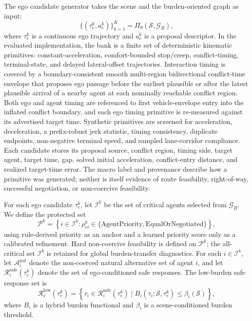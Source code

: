 \documentclass[10pt]{article}
\begin{document}
The ego candidate generator takes the scene and the burden-oriented graph as input:
\begin{equation}
    \{(\tau^k_e, a^k_e)\}_{k=1}^{K}
    =
    \Pi_{\theta}(\mathcal{S}, \mathcal{G}_B),
\end{equation}
where $\tau^k_e$ is a continuous ego trajectory and $a^k_e$ is a proposal descriptor. In the evaluated implementation, the bank is a finite set of deterministic kinematic primitives: constant-acceleration, comfort-bounded stop/creep, conflict-timing, terminal-state, and delayed lateral-offset trajectories. Interaction timing is covered by a boundary-consistent smooth multi-region bidirectional conflict-time envelope that proposes ego passage before the earliest plausible or after the latest plausible arrival of a nearby agent at each nominally reachable conflict region. Both ego and agent timing are referenced to first vehicle-envelope entry into the inflated conflict boundary, and each ego timing primitive is re-measured against its advertised target time. Synthetic primitives are screened for acceleration, deceleration, a prefix-robust jerk statistic, timing consistency, duplicate endpoints, non-negative terminal speed, and sampled lane-corridor compliance. Each candidate stores its proposal source, conflict region, timing side, target agent, target time, gap, solved initial acceleration, conflict-entry distance, and realized target-time error. The macro label and provenance describe how a primitive was generated; neither is itself evidence of route feasibility, right-of-way, successful negotiation, or non-coercive feasibility.

For each ego candidate $\tau^k_e$, let $\mathcal{I}^k$ be the set of critical agents selected from $\mathcal{G}_B$. We define the protected set
\begin{equation}
    \mathcal{P}^k
    =
    \left\{i\in\mathcal{I}^k:
    \rho^k_{ei}\in\{\mathrm{AgentPriority},\mathrm{EqualOrNegotiated}\}
    \right\},
    \label{eq:protected_set}
\end{equation}
using rule-derived priority as an anchor and a learned priority score only as a calibrated refinement. Hard non-coercive feasibility is defined on $\mathcal{P}^k$; the all-critical set $\mathcal{I}^k$ is retained for global burden-transfer diagnostics. For each $i\in\mathcal{I}^k$, let $\mathcal{A}^{\mathrm{nat}}_i$ denote the non-coerced natural alternative set of agent $i$, and let $\mathcal{R}^{\mathrm{safe}}_i(\tau^k_e)$ denote the set of ego-conditioned safe responses. The low-burden safe response set is
\begin{equation}
    \mathcal{R}^{\mathrm{low}}_i(\tau^k_e)
    =
    \left\{
    \tau_i \in \mathcal{R}^{\mathrm{safe}}_i(\tau^k_e)
    \mid
    B_i(\tau_i;\mathcal{S},\tau^k_e)
    \le
    \beta_i(\mathcal{S})
    \right\},
\end{equation}
where $B_i$ is a hybrid burden functional and $\beta_i$ is a scene-conditioned burden threshold.
\end{document}
